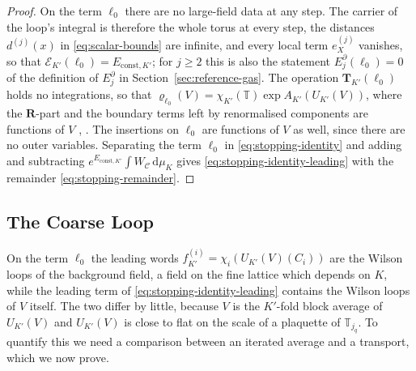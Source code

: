 \documentclass[11pt]{preprint}
\newcommand{\dd}{\mathrm{d}}
\numberwithin{equation}{section}
\theoremstyle{definition}
\theoremstyle{remark}
\theoremstyle{plain}
\begin{document}
\begin{proof}
On the term $\ell_0$ there are no large-field data at any step. The carrier of the loop's integral is therefore the whole torus at every step, the distances $d^{(j)}(x)$ in \eqref{eq:scalar-bounds} are infinite, and every local term $e^{(j)}_X$ vanishes, so that $\mathcal E_{K'}(\ell_0) = E_{\mathrm{const},K'}$; for $j \geq 2$ this is also the statement $E^\partial_j(\ell_0) = 0$ of the definition of $E^\partial_j$ in Section~\ref{sec:reference-gas}. The operation $\mathbf T_{K'}(\ell_0)$ holds no integrations, so that $\varrho_{\ell_0}(V) = \chi_{K'}(\mathbb T)\exp A_{K'}(U_{K'}(V))$, where the $\mathbf R$-part and the boundary terms left by renormalised components are functions of $V$ \cite[(0.6), p.~176]{BalabanLFR1}, \cite[p.~392]{BalabanLFR2}. The insertions on $\ell_0$ are functions of $V$ as well, since there are no outer variables. Separating the term $\ell_0$ in \eqref{eq:stopping-identity} and adding and subtracting $e^{E_{\mathrm{const},K'}}\int W_{\mathcal C}\,\dd\mu_K$ gives \eqref{eq:stopping-identity-leading} with the remainder \eqref{eq:stopping-remainder}.
\end{proof}

\subsection{The Coarse Loop}\label{sec:coarse-loop}

On the term $\ell_0$ the leading words $f^{(i)}_{K'} = \chi_i(U_{K'}(V)(C_i))$ are the Wilson loops of the background field, a field on the fine lattice which depends on $K$, while the leading term of \eqref{eq:stopping-identity-leading} contains the Wilson loops of $V$ itself. The two differ by little, because $V$ is the $K'$-fold block average of $U_{K'}(V)$ and $U_{K'}(V)$ is close to flat on the scale of a plaquette of $\mathbb T_{j_q}$. To quantify this we need a comparison between an iterated average and a transport, which we now prove.
\end{document}
